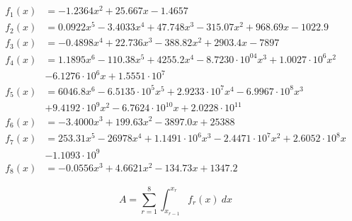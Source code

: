 \documentclass{article}
\begin{document}
    \begin{align*}
        f_1(x) &= -1.2364x^2 + 25.667x - 1.4657 \\
        f_2(x) &= 0.0922x^5 - 3.4033x^4 + 47.748x^3 - 315.07x^2 + 968.69x - 1022.9 \\
        f_3(x) &= -0.4898x^4 + 22.736x^3 - 388.82x^2 + 2903.4x - 7897 \\
        f_4(x) &= 1.1895x^6 - 110.38x^5 + 4255.2x^4 - 8.7230\cdot 10^04x^3 + 1.0027\cdot 10^6x^2 \\ &- 6.1276\cdot 10^6x + 1.5551\cdot 10^7 \\
        f_5(x) &= 6046.8x^6 - 6.5135 \cdot 10^5x^5 + 2.9233 \cdot 10^7x^4 - 6.9967 \cdot 10^8x^3 \\ &+ 9.4192 \cdot 10^9x^2 - 6.7624 \cdot 10^{10}x + 2.0228 \cdot 10^{11} \\
        f_6(x) &= -3.4000x^3 + 199.63x^2 - 3897.0x + 25388 \\
        f_7(x) &= 253.31x^5 - 26978x^4 + 1.1491 \cdot 10^6x^3 - 2.4471 \cdot 10^7x^2 + 2.6052 \cdot 10^8x \\ &- 1.1093 \cdot 10^9 \\
        f_8(x) &= -0.0556x^3 + 4.6621x^2 - 134.73x + 1347.2
    \end{align*}


    \begin{equation}
       A = \sum_{r=1}^8 \int_{x_{r-1}}^{x_r} f_r(x)\ {dx}
    \end{equation}
 
\end{document}

